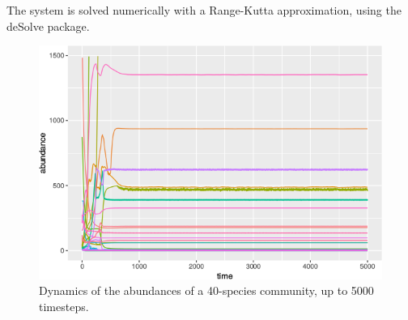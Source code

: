 \normalsize

The system is solved numerically with a Range-Kutta approximation, using
the deSolve package.

\small

\begin{Shaded}
\begin{Highlighting}[]
\StringTok{ }\NormalTok{(}   
      \NormalTok{)}
\end{Highlighting}
\end{Shaded}

\normalsize

\begin{figure}[ht]
\centering
\includegraphics[width=\textwidth]{./Figures/Appendix3_1/Fig_3.png}
\caption[Modelled community dynamics]{\color{Gray} Dynamics of the abundances of a 40-species community, up to 5000 timesteps.}
\label{fig:figApp3.1.3}
\end{figure}

